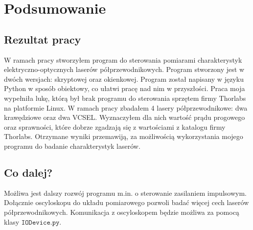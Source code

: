 \chapter{Podsumowanie}
\section{Rezultat pracy}
W ramach pracy stworzyłem program do sterowania pomiarami charakterystyk elektryczno-optycznych laserów półprzewodnikowych.
 Program stworzony jest
w dwóch wersjach: skryptowej oraz okienkowej. Program został napisany w języku Python w sposób obiektowy, co ułatwi
pracę nad nim w przyszłości. Praca moja wypełniła lukę, którą był brak programu do sterowania sprzętem firmy Thorlabs
na platformie Linux. W ramach pracy zbadałem 4 lasery półprzewodnikowe: dwa krawędziowe oraz dwa VCSEL. Wyznaczyłem dla nich
wartość prądu progowego oraz sprawności, które dobrze zgadzają się z wartościami z katalogu firmy Thorlabs. Otrzymane wyniki
przemawiją, za możliwością wykorzystania mojego programu do badanie charakterystyk laserów.
\section{Co dalej?}
Możliwa jest dalszy rozwój programu m.in. o sterowanie zasilaniem impulsowym. Dołącznie oscyloskopu do układu pomiarowego pozwoli badać więcej cech
 laserów półprzewodnikowych. Komunikacja z oscyloskopem będzie możliwa za pomocą klasy $\mathtt{IODevice.py}$.

